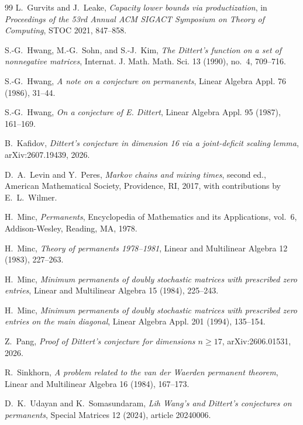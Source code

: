 \documentclass[10pt,a4paper]{amsart}
\theoremstyle{definition}
\theoremstyle{remark}
\begin{document}
\begin{thebibliography}{99}
L.~Gurvits and J.~Leake,
\emph{Capacity lower bounds via productization},
in \emph{Proceedings of the 53rd Annual ACM SIGACT Symposium on Theory of
Computing}, STOC 2021, 847--858.

S.-G.~Hwang, M.-G.~Sohn, and S.-J.~Kim,
\emph{The Dittert's function on a set of nonnegative matrices},
Internat. J. Math. Math. Sci. 13 (1990), no.~4, 709--716.

S.-G.~Hwang,
\emph{A note on a conjecture on permanents},
Linear Algebra Appl. 76 (1986), 31--44.

S.-G.~Hwang,
\emph{On a conjecture of E. Dittert},
Linear Algebra Appl. 95 (1987), 161--169.

B.~Kafidov,
\emph{Dittert's conjecture in dimension 16 via a joint-deficit scaling
lemma},
arXiv:2607.19439, 2026.

D.~A.~Levin and Y.~Peres,
\emph{Markov chains and mixing times}, second ed.,
American Mathematical Society, Providence, RI, 2017,
with contributions by E.~L.~Wilmer.

H.~Minc,
\emph{Permanents},
Encyclopedia of Mathematics and its Applications, vol.~6,
Addison-Wesley, Reading, MA, 1978.

H.~Minc,
\emph{Theory of permanents 1978--1981},
Linear and Multilinear Algebra 12 (1983), 227--263.

H.~Minc,
\emph{Minimum permanents of doubly stochastic matrices with prescribed
zero entries},
Linear and Multilinear Algebra 15 (1984), 225--243.

H.~Minc,
\emph{Minimum permanents of doubly stochastic matrices with prescribed
zero entries on the main diagonal},
Linear Algebra Appl. 201 (1994), 135--154.

Z.~Pang,
\emph{Proof of Dittert's conjecture for dimensions \(n\geq17\)},
arXiv:2606.01531, 2026.

R.~Sinkhorn,
\emph{A problem related to the van der Waerden permanent theorem},
Linear and Multilinear Algebra 16 (1984), 167--173.

D.~K.~Udayan and K.~Somasundaram,
\emph{Lih Wang's and Dittert's conjectures on permanents},
Special Matrices 12 (2024), article 20240006.

\end{thebibliography}
\end{document}
